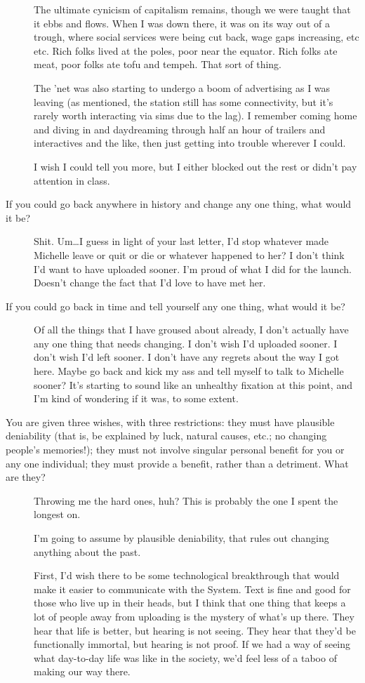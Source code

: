 \begin{description}
The ultimate cynicism of capitalism remains, though we were taught that it ebbs and flows. When I was down there, it was on its way out of a trough, where social services were being cut back, wage gaps increasing, etc etc. Rich folks lived at the poles, poor near the equator. Rich folks ate meat, poor folks ate tofu and tempeh. That sort of thing.

The 'net was also starting to undergo a boom of advertising as I was leaving (as mentioned, the station still has some connectivity, but it's rarely worth interacting via sims due to the lag). I remember coming home and diving in and daydreaming through half an hour of trailers and interactives and the like, then just getting into trouble wherever I could.

I wish I could tell you more, but I either blocked out the rest or didn't pay attention in class.
\item[If you could go back anywhere in history and change any one thing, what would it be?]
Shit. Um\ldots I guess in light of your last letter, I'd stop whatever made Michelle leave or quit or die or whatever happened to her? I don't think I'd want to have uploaded sooner. I'm proud of what I did for the launch. Doesn't change the fact that I'd love to have met her.
\item[If you could go back in time and tell yourself any one thing, what would it be?]
Of all the things that I have groused about already, I don't actually have any one thing that needs changing. I don't wish I'd uploaded sooner. I don't wish I'd left sooner. I don't have any regrets about the way I got here. Maybe go back and kick my ass and tell myself to talk to Michelle sooner? It's starting to sound like an unhealthy fixation at this point, and I'm kind of wondering if it was, to some extent.
\item[You are given three wishes, with three restrictions: they must have plausible deniability (that is, be explained by luck, natural causes, etc.; no changing people's memories!); they must not involve singular personal benefit for you or any one individual; they must provide a benefit, rather than a detriment. What are they?]
Throwing me the hard ones, huh? This is probably the one I spent the longest on.

I'm going to assume by plausible deniability, that rules out changing anything about the past.

First, I'd wish there to be some technological breakthrough that would make it easier to communicate with the System. Text is fine and good for those who live up in their heads, but I think that one thing that keeps a lot of people away from uploading is the mystery of what's up there. They hear that life is better, but hearing is not seeing. They hear that they'd be functionally immortal, but hearing is not proof. If we had a way of seeing what day-to-day life was like in the society, we'd feel less of a taboo of making our way there.


\end{description}
